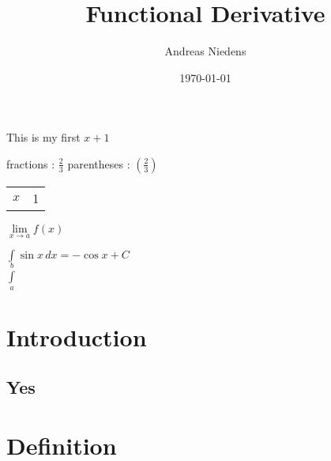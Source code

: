 \documentclass[12pt]{article}
\begin{document}
\tableofcontents

\title{Functional Derivative}
\author{Andreas Niedens}
\date{\today}
\maketitle

This is my first $x+1$

fractions : $\displaystyle{\frac{2}{3}}$
parentheses : $\displaystyle{\left(\frac{2}{3}\right)}$

\begin{tabular}{cc}
	$x$ & 1
\end{tabular}

$\lim \limits_{x \to a} f(x)$

$\displaystyle{\int \sin x \,dx = -\cos x + C}$\\
$\displaystyle{\int \limits_a^b}$\\

\section{Introduction}
	\subsection{Yes}
\section{Definition}
\end{document}
